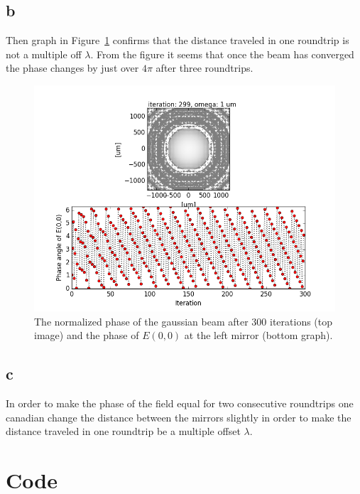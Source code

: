 \documentclass[12pt,a4paper]{article}
\begin{document}
\subsection{b}
Then graph in Figure~\ref{fig:task7b} confirms that the distance traveled in one roundtrip is not a multiple off $\lambda$. From the figure it seems that once the beam has converged the phase changes by just over $4\pi$ after three roundtrips.
\begin{figure}
  \centering
  \includegraphics[width=\textwidth]{7b_gauss_0_0.png}
  \caption{The normalized phase of the gaussian beam after 300 iterations (top image) and the phase of $E(0,0)$ at the left mirror (bottom graph).}
  \label{fig:task7b}
\end{figure}

\subsection{c}
In order to make the phase of the field equal for two consecutive roundtrips one canadian change the distance between the mirrors slightly in order to make the distance traveled in one roundtrip be a multiple offset $\lambda$.
\newpage
\appendix
\section{Code}
\begin{changemargin}{-3cm}{0.5cm}

\end{changemargin}
\end{document}
